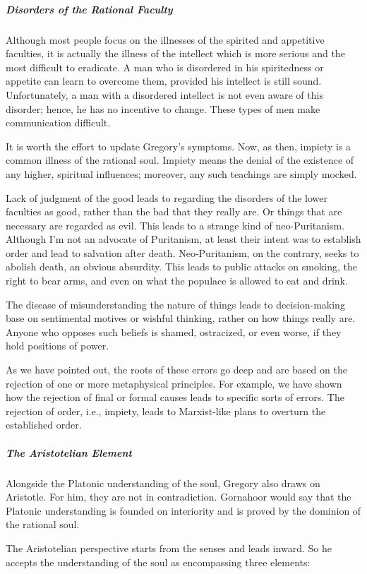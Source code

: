 \subparagraph{Disorders of the Rational Faculty}
Although most people focus on the illnesses of the spirited and appetitive faculties, it is actually the illness of the intellect which is more serious and the most difficult to eradicate. A man who is disordered in his spiritedness or appetite can learn to overcome them, provided his intellect is still sound. Unfortunately, a man with a disordered intellect is not even aware of this disorder; hence, he has no incentive to change. These types of men make communication difficult.

It is worth the effort to update Gregory's symptoms. Now, as then, impiety is a common illness of the rational soul. Impiety means the denial of the existence of any higher, spiritual influences; moreover, any such teachings are simply mocked.

Lack of judgment of the good leads to regarding the disorders of the lower faculties as good, rather than the bad that they really are. Or things that are necessary are regarded as evil. This leads to a strange kind of neo-Puritanism. Although I'm not an advocate of Puritanism, at least their intent was to establish order and lead to salvation after death. Neo-Puritanism, on the contrary, seeks to abolish death, an obvious absurdity. This leads to public attacks on smoking, the right to bear arms, and even on what the populace is allowed to eat and drink.

The disease of misunderstanding the nature of things leads to decision-making base on sentimental motives or wishful thinking, rather on how things really are. Anyone who opposes such beliefs is shamed, ostracized, or even worse, if they hold positions of power.

As we have pointed out, the roots of these errors go deep and are based on the rejection of one or more metaphysical principles. For example, we have shown how the rejection of final or formal causes leads to specific sorts of errors. The rejection of order, i.e., impiety, leads to Marxist-like plans to overturn the established order.

\subparagraph{The Aristotelian Element}
Alongside the Platonic understanding of the soul, Gregory also draws on Aristotle. For him, they are not in contradiction. Gornahoor would say that the Platonic understanding is founded on interiority and is proved by the dominion of the rational soul.

The Aristotelian perspective starts from the senses and leads inward. So he accepts the understanding of the soul as encompassing three elements:

